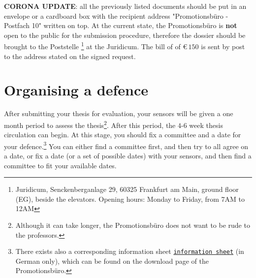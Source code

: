 \documentclass[a4paper]{article}
\newcommand{\file}[2][]{%
    \ifthenelse{\isempty{#1}}%
        {\textcolor{fileColor}{#2}}%
        {\href{run:#1}{\texttt{\textcolor{fileColor}{#2}}}}%
}
\begin{document}
        \textbf{CORONA UPDATE}: all the previously listed documents should be put in an envelope or a cardboard box with the recipient address "Promotionsb\"uro - Postfach 10" written on top. At the current state, the Promotionsb\"uro is \textbf{not} open to the public for the submission procedure, therefore the dossier should be brought to the Poststelle \footnote{Juridicum, Senckenberganlage 29, 60325 Frankfurt am Main, ground floor (EG), beside the elevators. Opening hours: Monday to Friday, from 7AM to 12AM} at the Juridicum. The bill of of \euro$\,150$ is sent by post to the address stated on the {signed request}.
        

    \section*{Organising a defence}\label{defence}
        After submitting your thesis for evaluation, your sensors will be given a one month period to assess the thesis\footnote{Although it can take longer, the Promotionsb\"uro does not want to be rude to the professors.}.
        After this period, the $4$-$6$ week thesis circulation can begin.
        At this stage, you should fix a committee and a date for your defence.\footnote{There exists also a corresponding \file[Merkblatt_Physik.pdf]{information sheet} (in German only), which can be found on the download page of the Promotionsb\"uro.}
        You can either find a committee first, and then try to all agree on a date, or fix a date (or a set of possible dates) with your sensors, and then find a committee to fit your available dates.
\end{document}
